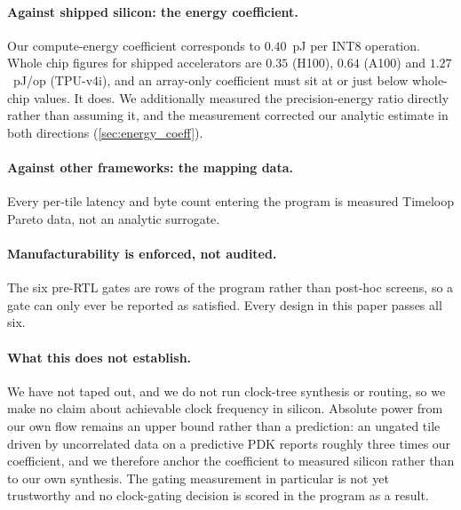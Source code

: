 \paragraph{Against shipped silicon: the energy coefficient.}
Our compute-energy coefficient corresponds to $0.40$~pJ per INT8 operation. Whole
chip figures for shipped accelerators are $0.35$ (H100), $0.64$ (A100) and
$1.27$~pJ/op (TPU-v4i), and an array-only coefficient must sit at or just below
whole-chip values. It does. We additionally measured the precision-energy ratio
directly rather than assuming it, and the measurement corrected our analytic
estimate in both directions (\cref{sec:energy_coeff}).

\paragraph{Against other frameworks: the mapping data.}
Every per-tile latency and byte count entering the program is measured Timeloop
Pareto data, not an analytic surrogate.

\paragraph{Manufacturability is enforced, not audited.}
The six pre-RTL gates are rows of the program rather than post-hoc screens, so a
gate can only ever be reported as satisfied. Every design in this paper passes
all six.

\paragraph{What this does not establish.}
We have not taped out, and we do not run clock-tree synthesis or routing, so we
make no claim about achievable clock frequency in silicon. Absolute power from
our own flow remains an upper bound rather than a prediction: an ungated tile
driven by uncorrelated data on a predictive PDK reports roughly three times our
coefficient, and we therefore anchor the coefficient to measured silicon rather
than to our own synthesis. The gating measurement in particular is not yet
trustworthy and no clock-gating decision is scored in the program as a result.
